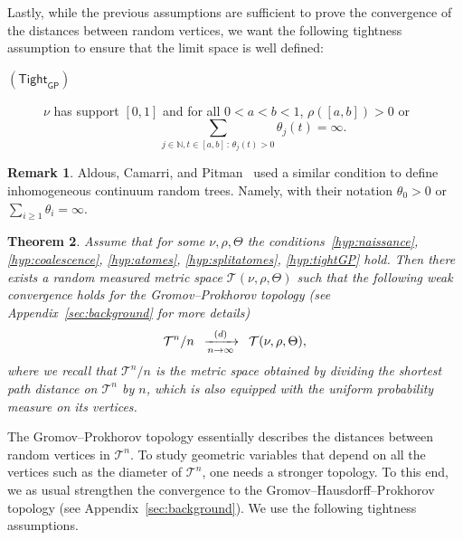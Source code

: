 \documentclass[10pt]{amsart}
\makeatletter
\newtheorem{theo}{Theorem}[section]
\theoremstyle{definition}\newtheorem{defi}[theo]{Definition}\newtheorem{rema}[theo]{Remark}\newtheorem{exam}[theo]{Example}\newtheorem{exem}[theo]{Example}\newtheorem{nota}[theo]{Notation}
\newcommand{\optionaldesc}[2]{
\phantomsection #1\protected@edef\@currentlabel{#1}\label{#2}
}
\newcommand{\cvloi}[1][n]{\enskip\xrightarrow[#1 \to \infty]{(d)}\enskip}
\newcommand{\N}{\mathbb{N}}
\newcommand{\1}{\mathbbm{1}}
\newcommand{\T}{\mathcal{T}}
\newcommand{\sTight}{\mathsf{Tight}}
\newcommand{\sGP}{\mathsf{GP}}
\renewcommand*{\to}{\mathchoice{\longrightarrow}{\rightarrow}{\rightarrow}{\rightarrow}}
\makeatother
\begin{document}
Lastly, while the previous assumptions are sufficient to prove the convergence of the distances between random vertices, we want the following tightness assumption to ensure that the limit space is well defined:
\smallskip
\begin{mdframed}[linecolor=black!60]
\begin{description}
\item[\textcolor{link}{\optionaldesc{$(\sTight_{\sGP})$}{hyp:tightGP}}] $\nu$ has support $[0,1]$ and for all $0<a<b<1$, $\rho([a,b])>0$ or
\[
\sum_{j\in \N,t\in [a,b]\,:\,\theta_{j}(t)>0} \theta_j(t)=\infty.
\]
\end{description}
\end{mdframed}
\begin{rema}
Aldous, Camarri, and Pitman~\cite{introICRT1,introICRT2} used a similar condition to define inhomogeneous continuum random trees. Namely, with their notation $\theta_0>0$ or $\sum_{i\geq 1} \theta_i=\infty$.
\end{rema}


\begin{theo}\label{th:GP}
Assume that for some $\nu, \rho,\Theta$ the conditions~\ref{hyp:naissance}, \ref{hyp:coalescence}, \ref{hyp:atomes}, \ref{hyp:splitatomes}, \ref{hyp:tightGP} hold. Then there exists a random measured metric space $\T(\nu,\rho,\Theta)$ such that the following weak convergence holds for the Gromov--Prokhorov topology (see Appendix~\ref{sec:background} for more details)
\[
\T^n/n \cvloi \T(\nu,\rho,\Theta),
\]
{where we recall that $\T^n/n$ is the metric space obtained by dividing the shortest path distance on $\T^n$ by $n$, which is also equipped} with the uniform probability measure on its vertices.
\end{theo}

The Gromov--Prokhorov topology essentially describes the distances between random vertices in $\T^n$. To study geometric variables that depend on all the vertices such as the diameter of $\T^n$, one needs a stronger topology. To this end, we as usual strengthen the convergence to the Gromov--Hausdorff--Prokhorov topology (see Appendix~\ref{sec:background}). We use the following tightness assumptions.
\end{document}

